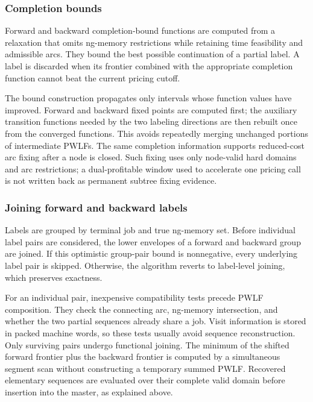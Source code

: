 \subsubsection{Completion bounds}

Forward and backward completion-bound functions are computed from a relaxation
that omits ng-memory restrictions while retaining time feasibility and admissible
arcs. They bound the best possible continuation of a partial label. A label is
discarded when its frontier combined with the appropriate completion function
cannot beat the current pricing cutoff.

The bound construction propagates only intervals whose function values have
improved. Forward and backward fixed points are computed first; the auxiliary
transition functions needed by the two labeling directions are then rebuilt once
from the converged functions. This avoids repeatedly merging unchanged portions of
intermediate PWLFs. The same completion information supports reduced-cost arc
fixing after a node is closed. Such fixing uses only node-valid hard domains and
arc restrictions; a dual-profitable window used to accelerate one pricing call is
not written back as permanent subtree fixing evidence.

\subsubsection{Joining forward and backward labels}

Labels are grouped by terminal job and true ng-memory set. Before individual label
pairs are considered, the lower envelopes of a forward and backward group are
joined. If this optimistic group-pair bound is nonnegative, every underlying label
pair is skipped. Otherwise, the algorithm reverts to label-level joining, which
preserves exactness.

For an individual pair, inexpensive compatibility tests precede PWLF composition.
They check the connecting arc, ng-memory intersection, and whether the two partial
sequences already share a job. Visit information is stored in packed machine words,
so these tests usually avoid sequence reconstruction. Only surviving pairs undergo
functional joining. The minimum of the shifted forward frontier plus the backward
frontier is computed by a simultaneous segment scan without constructing a
temporary summed PWLF. Recovered elementary sequences are evaluated over their
complete valid domain before insertion into the master, as explained above.

